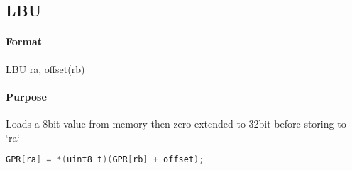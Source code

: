 \subsection{LBU}


\paragraph{Format} LBU ra, offset(rb)

\paragraph{Purpose} Loads a 8bit value from memory then zero extended to 32bit before storing to `ra`

\begin{lstlisting}[language=C]
    GPR[ra] = *(uint8_t)(GPR[rb] + offset);
\end{lstlisting}